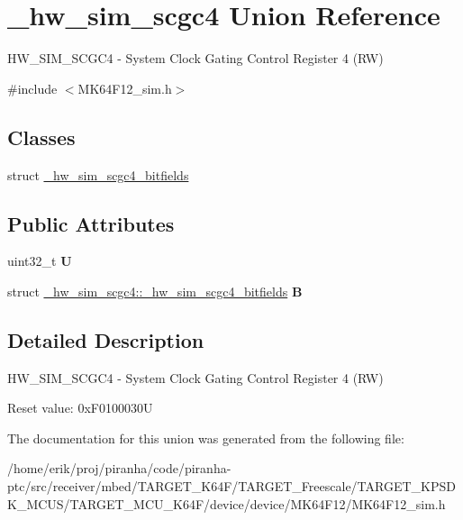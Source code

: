 \hypertarget{union__hw__sim__scgc4}{}\section{\+\_\+hw\+\_\+sim\+\_\+scgc4 Union Reference}
\label{union__hw__sim__scgc4}


H\+W\+\_\+\+S\+I\+M\+\_\+\+S\+C\+G\+C4 -\/ System Clock Gating Control Register 4 (RW)  




{\ttfamily \#include $<$M\+K64\+F12\+\_\+sim.\+h$>$}

\subsection*{Classes}
\begin{DoxyCompactItemize}
\item 
struct \hyperlink{struct__hw__sim__scgc4_1_1__hw__sim__scgc4__bitfields}{\+\_\+hw\+\_\+sim\+\_\+scgc4\+\_\+bitfields}
\end{DoxyCompactItemize}
\subsection*{Public Attributes}
\begin{DoxyCompactItemize}
\item 
uint32\+\_\+t {\bfseries U}\hypertarget{union__hw__sim__scgc4_a27517dc7afbc57db515caa0a21fd5a29}{}\label{union__hw__sim__scgc4_a27517dc7afbc57db515caa0a21fd5a29}

\item 
struct \hyperlink{struct__hw__sim__scgc4_1_1__hw__sim__scgc4__bitfields}{\+\_\+hw\+\_\+sim\+\_\+scgc4\+::\+\_\+hw\+\_\+sim\+\_\+scgc4\+\_\+bitfields} {\bfseries B}\hypertarget{union__hw__sim__scgc4_aa86247f6206771101a53960f2657f2bf}{}\label{union__hw__sim__scgc4_aa86247f6206771101a53960f2657f2bf}

\end{DoxyCompactItemize}


\subsection{Detailed Description}
H\+W\+\_\+\+S\+I\+M\+\_\+\+S\+C\+G\+C4 -\/ System Clock Gating Control Register 4 (RW) 

Reset value\+: 0x\+F0100030U 

The documentation for this union was generated from the following file\+:\begin{DoxyCompactItemize}
\item 
/home/erik/proj/piranha/code/piranha-\/ptc/src/receiver/mbed/\+T\+A\+R\+G\+E\+T\+\_\+\+K64\+F/\+T\+A\+R\+G\+E\+T\+\_\+\+Freescale/\+T\+A\+R\+G\+E\+T\+\_\+\+K\+P\+S\+D\+K\+\_\+\+M\+C\+U\+S/\+T\+A\+R\+G\+E\+T\+\_\+\+M\+C\+U\+\_\+\+K64\+F/device/device/\+M\+K64\+F12/M\+K64\+F12\+\_\+sim.\+h\end{DoxyCompactItemize}

